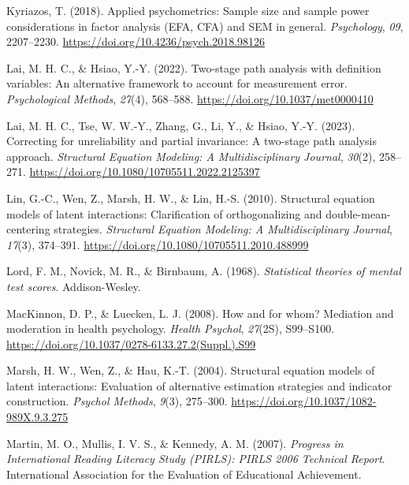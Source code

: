 \documentclass[
  man]{apa6}
\newlength{\cslhangindent}
\newenvironment{CSLReferences}[2] %
 {\begin{list}{}{%
  \setlength{\itemindent}{0pt}
  \setlength{\leftmargin}{0pt}
  \setlength{\parsep}{0pt}
  \ifodd #1
   \setlength{\leftmargin}{\cslhangindent}
   \setlength{\itemindent}{-1\cslhangindent}
  \fi
  \setlength{\itemsep}{#2\baselineskip}}}
 {\end{list}}
\begin{document}
\begin{CSLReferences}{1}{0}
Kyriazos, T. (2018). Applied psychometrics: {Sample} size and sample power considerations in factor analysis ({EFA}, {CFA}) and {SEM} in general. \emph{Psychology}, \emph{09}, 2207--2230. \url{https://doi.org/10.4236/psych.2018.98126}

Lai, M. H. C., \& Hsiao, Y.-Y. (2022). Two-stage path analysis with definition variables: {An} alternative framework to account for measurement error. \emph{Psychological Methods}, \emph{27}(4), 568--588. \url{https://doi.org/10.1037/met0000410}

Lai, M. H. C., Tse, W. W.-Y., Zhang, G., Li, Y., \& Hsiao, Y.-Y. (2023). Correcting for unreliability and partial invariance: {A} two-stage path analysis approach. \emph{Structural Equation Modeling: A Multidisciplinary Journal}, \emph{30}(2), 258--271. \url{https://doi.org/10.1080/10705511.2022.2125397}

Lin, G.-C., Wen, Z., Marsh, H. W., \& Lin, H.-S. (2010). Structural equation models of latent interactions: {Clarification} of orthogonalizing and double-mean-centering strategies. \emph{Structural Equation Modeling: A Multidisciplinary Journal}, \emph{17}(3), 374--391. \url{https://doi.org/10.1080/10705511.2010.488999}

Lord, F. M., Novick, M. R., \& Birnbaum, A. (1968). \emph{Statistical theories of mental test scores}. Addison-Wesley.

MacKinnon, D. P., \& Luecken, L. J. (2008). How and for whom? {Mediation} and moderation in health psychology. \emph{Health Psychol}, \emph{27}(2S), S99--S100. \url{https://doi.org/10.1037/0278-6133.27.2(Suppl.).S99}

Marsh, H. W., Wen, Z., \& Hau, K.-T. (2004). Structural equation models of latent interactions: Evaluation of alternative estimation strategies and indicator construction. \emph{Psychol Methods}, \emph{9}(3), 275--300. \url{https://doi.org/10.1037/1082-989X.9.3.275}

Martin, M. O., Mullis, I. V. S., \& Kennedy, A. M. (2007). \emph{Progress in {International Reading Literacy Study} ({PIRLS}): {PIRLS} 2006 {Technical Report}}. International Association for the Evaluation of Educational Achievement.


\end{CSLReferences}
\end{document}
